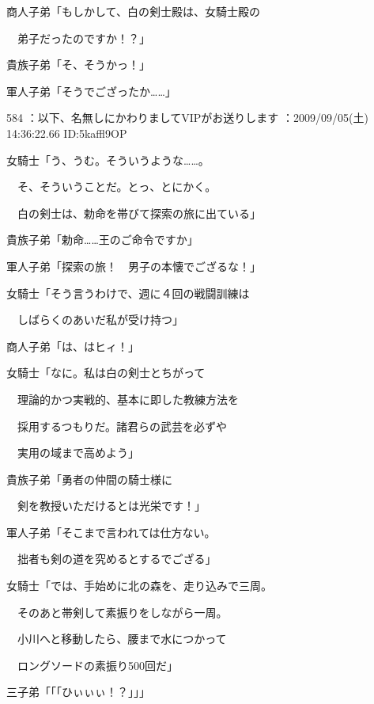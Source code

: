 \documentclass[a4j,twocolumn]{tarticle}
\begin{document}
商人子弟「もしかして、白の剣士殿は、女騎士殿の\par{} 
　弟子だったのですか！？」 



貴族子弟「そ、そうかっ！」\par{} 
軍人子弟「そうでござったか……」 

	
    
    

584 ：以下、名無しにかわりましてVIPがお送りします ：2009/09/05(土) 14:36:22.66 ID:5kaffl9OP 


女騎士「う、うむ。そういうような……。\par{} 
　そ、そういうことだ。とっ、とにかく。\par{} 
　白の剣士は、勅命を帯びて探索の旅に出ている」 



貴族子弟「勅命……王のご命令ですか」\par{} 
軍人子弟「探索の旅！　男子の本懐でござるな！」 



女騎士「そう言うわけで、週に４回の戦闘訓練は\par{} 
　しばらくのあいだ私が受け持つ」 



商人子弟「は、はヒィ！」 



女騎士「なに。私は白の剣士とちがって\par{} 
　理論的かつ実戦的、基本に即した教練方法を\par{} 
　採用するつもりだ。諸君らの武芸を必ずや\par{} 
　実用の域まで高めよう」 



貴族子弟「勇者の仲間の騎士様に\par{} 
　剣を教授いただけるとは光栄です！」\par{} 
軍人子弟「そこまで言われては仕方ない。\par{} 
　拙者も剣の道を究めるとするでござる」 



女騎士「では、手始めに北の森を、走り込みで三周。\par{} 
　そのあと帯剣して素振りをしながら一周。\par{} 
　小川へと移動したら、腰まで水につかって\par{} 
　ロングソードの素振り500回だ」 



三子弟「「「ひぃぃぃ！？」」」 
\end{document}
